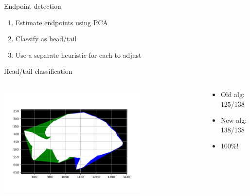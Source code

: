 \begin{frame}{Endpoint detection}
    \begin{enumerate}
        \item Estimate endpoints using PCA
        \item Classify as head/tail
        \item Use a separate heuristic for each to adjust
    \end{enumerate}
\end{frame}

\begin{frame}{Head/tail classification}
    \begin{columns}
        \begin{column}{0.7\textwidth}
            \includegraphics[height=0.7\textheight,width=0.7\textwidth,keepaspectratio]{images/fs_convex_difference.png}
        \end{column}
        \begin{column}{0.4\textwidth}

            \begin{itemize}
                \item Old alg: 125/138
                \item New alg: 138/138
                \item 100\%!
            \end{itemize}
        \end{column}
    \end{columns}
\end{frame}

